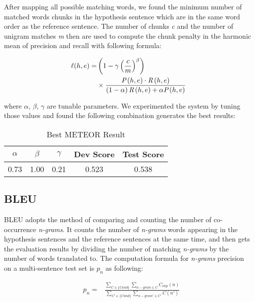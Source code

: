 \documentclass[11pt]{article}
\begin{document}
After mapping all possible matching words, we found the minimum number of matched words chunks in the hypothesis sentence which are in the same word order as the reference sentence. The number of chunks \emph{c} and the number of unigram matches \emph{m} then are used to compute the chunk penalty in the harmonic mean of precision and recall with following formula:

\begin{equation}
\begin{aligned}
\ell(h,e)=& \left ( 1-\gamma\left ( \frac{c}{m} \right )^{\beta} \right )\\&\times\frac{\emph{P}\left (h,e  \right )\cdot\emph{R}\left (h,e  \right )}{\left ( 1-\alpha \right )\emph{R}\left (h,e  \right )+\alpha\emph{P}\left (h,e  \right )}
\end{aligned}
\end{equation}

where $\alpha$, $\beta$, $\gamma$ are tunable parameters. We experimented the system by tuning those values and found the following combination generates the best results:

\begin{table}[h]
\begin{center}
\begin{tabular}{|c | c |c |c| c|} 
\hline
$\alpha$ & $\beta$ & $\gamma$ & {\bf Dev Score} & {\bf Test Score }\\ [0.5ex]
\hline
0.73 & 1.00 & 0.21 & 0.523 & 0.538 \\
\hline
\end{tabular}
\end{center}
\caption{\label{tab:meteor} Best METEOR Result }
\end{table}

\subsection{BLEU}
BLEU \cite{ACL:02} adopts the method of comparing and counting the number of co-occurrence \emph{n-grams}. It counts the number of \emph{n-grams} words appearing in the hypothesis sentences and the reference sentences at the same time, and then gets the evaluation results by dividing the number of matching \emph{n-grams} by the number of words translated to. The computation formula for \emph{n-grams} precision on a multi-sentence test set is $p_{n}$ as following:

\begin{equation}
\begin{aligned}
& p_{n} = 
& \frac{\sum\limits_{C \in \{Cand\}} \sum\limits_{n-gram \in C} C_{clip}(n)}{\sum\limits_{C' \in \{Cand\}} \sum\limits_{n-gram' \in C'} C(n')}
\end{aligned}
\end{equation}
\end{document}
